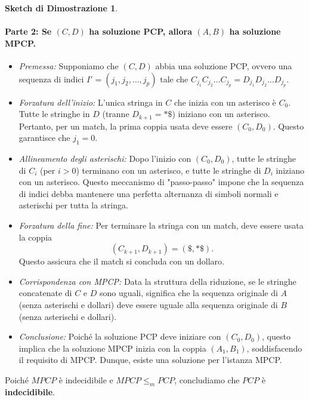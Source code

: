 \documentclass[a4paper]{article}
\theoremstyle{definition} %
\newtheorem{proof_sketch}{Sketch di Dimostrazione} %
\theoremstyle{remark} %
\begin{document}
\begin{proof_sketch}
\paragraph{Parte 2: Se $(C, D)$ ha soluzione PCP, allora $(A, B)$ ha soluzione MPCP.}

\begin{itemize}
    \item \emph{Premessa:} Supponiamo che $(C, D)$ abbia una soluzione PCP, ovvero una sequenza di indici $I' = (j_1, j_2, \dots, j_p)$ tale che $C_{j_1} C_{j_2} \dots C_{j_p} = D_{j_1} D_{j_2} \dots D_{j_p}$.
    
    \item \emph{Forzatura dell'inizio:} L'unica stringa in $C$ che inizia con un asterisco è $C_0$. Tutte le stringhe in $D$ (tranne $D_{k+1}=*\$$) iniziano con un asterisco. Pertanto, per un match, la prima coppia usata deve essere $(C_0, D_0)$. Questo garantisce che $j_1 = 0$.
    
    \item \emph{Allineamento degli asterischi:} Dopo l'inizio con $(C_0, D_0)$, tutte le stringhe di $C_i$ (per $i>0$) terminano con un asterisco, e tutte le stringhe di $D_i$ iniziano con un asterisco. Questo meccanismo di "passo-passo" impone che la sequenza di indici debba mantenere una perfetta alternanza di simboli normali e asterischi per tutta la stringa.
    
    \item \emph{Forzatura della fine:} Per terminare la stringa con un match, deve essere usata la coppia
    $$(C_{k+1}, D_{k+1}) = (\$, *\$).$$
    Questo assicura che il match si concluda con un dollaro.
    
    \item \emph{Corrispondenza con MPCP:} Data la struttura della riduzione, se le stringhe concatenate di $C$ e $D$ sono uguali, significa che la sequenza originale di $A$ (senza asterischi e dollari) deve essere uguale alla sequenza originale di $B$ (senza asterischi e dollari).
    
    \item \emph{Conclusione:} Poiché la soluzione PCP deve iniziare con $(C_0, D_0)$, questo implica che la soluzione MPCP inizia con la coppia $(A_1, B_1)$, soddisfacendo il requisito di MPCP. Dunque, esiste una soluzione per l'istanza MPCP.
\end{itemize}
\end{proof_sketch}

Poiché $MPCP$ è indecidibile e $MPCP \le_m PCP$, concludiamo che $PCP$ è \textbf{indecidibile}.
\end{document}
